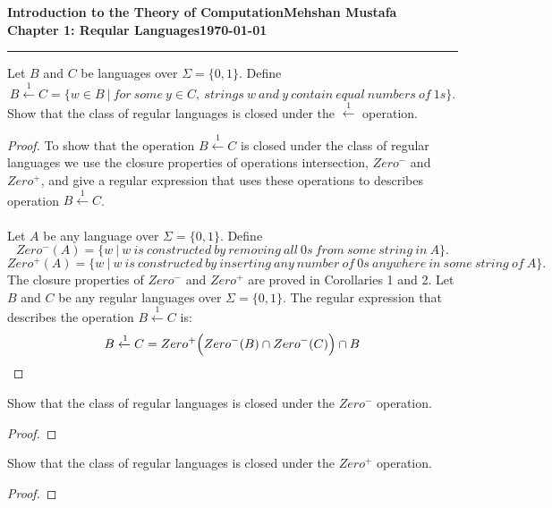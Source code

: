 \documentclass[11pt]{article}
\newcommand{\myname}{Mehshan Mustafa}
\newcommand{\dated}{\today}
\newenvironment{problem}[2][Problem]{\begin{trivlist}
\item[\hskip \labelsep {\bfseries #1}\hskip \labelsep {\bfseries #2.}]}{\end{trivlist}}
\newenvironment{corollary}[2][Corollary]{\begin{trivlist}
\item[\hskip \labelsep {\bfseries #1}\hskip \labelsep {\bfseries #2.}]}{\end{trivlist}}
\begin{document}
\textbf{Introduction to the Theory of
Computation}\hfill\textbf{\myname}\\[0.01in]
\textbf{Chapter 1: Reqular Languages}\hfill\textbf{\dated}\\
\smallskip\hrule\bigskip

\begin{problem}{1.41}
Let $B$ and $C$ be languages over $\Sigma = \{0, 1\}$. Define
\[
B \xleftarrow{1} C = \{ w \in B \ |  \ for \ some \ y \in C, \ strings \ w \ and \ y \ contain \ equal \ numbers \ of \ 1s \}.
\]
Show that the class of regular languages is closed under the $\xleftarrow{1}$ operation.
\end{problem}

\begin{proof}
To show that the operation $B \xleftarrow{1} C$ is closed under the class of regular languages we use the closure properties of operations intersection, $Zero^{-}$ and $Zero^{+}$, and give a regular expression that uses these operations to describes  operation $B \xleftarrow{1} C$.
\\
\\
Let $A$ be any language over $\Sigma = \{0, 1\}$. Define
\[
Zero^{-}(A) = \{ w \ | \ w \ is \ constructed \ by \ removing \ all \ 0s \ from \ some \ string \ in \ A \}.
\]
\[
Zero^{+}(A) = \{ w \ | \ w \ is \ constructed \ by \ inserting \ any \ number \ of \ 0s \ anywhere \ in \ some \ string \ of \ A \}.
\]
The closure properties of $Zero^{-}$ and $Zero^{+}$ are proved in Corollaries 1 and 2. Let $B$ and $C$ be any regular languages over $\Sigma = \{0, 1\}$. The regular expression that describes the operation $B \xleftarrow{1} C$ is:
\[
B \xleftarrow{1} C = Zero^{+} \Bigl( Zero^{-}(B) \cap Zero^{-}(C) \Bigr) \cap B
\]
\end{proof}

\begin{corollary}{1}
Show that the class of regular languages is closed under the $Zero^{-}$ operation.
\end{corollary}

\begin{proof}
\end{proof}

\begin{corollary}{2}
Show that the class of regular languages is closed under the $Zero^{+}$ operation.
\end{corollary}

\begin{proof}
\end{proof}
\end{document}
